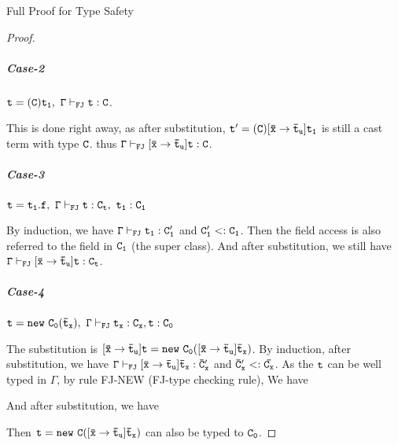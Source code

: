 \begin{section}{Full Proof for Type Safety}
\begin{proof}
\subparagraph{Case-2}$\tt t=(C) t_1,\ \Gamma\vdash_{FJ} t:C$.
\par This is done right away, as after substitution, $\tt t'=(C)[\bar{x}\rightarrow \bar{t}_u]t_1$ is still a cast term with type $\tt C$. thus $\tt\Gamma \vdash_{FJ} [\bar{x}\rightarrow\bar{t}_u]t:C$.

\subparagraph{Case-3}$\tt t=t_1.f,\ \Gamma\vdash_{FJ} t:C_t,\ t_1:C_1$
\par
By induction, we have $\tt \Gamma\vdash_{FJ} t_1:C'_1$ and $\tt C'_1 <: C_1$. 
Then the field access is also referred to the field in $\tt C_1$ (the super class). And after substitution, we still have $\tt \Gamma\vdash_{FJ} [\bar{x}\rightarrow\bar{t}_u]t:C_t$.

\subparagraph{Case-4} $\tt t=new\ C_0(\bar{t}_x),\ \Gamma\vdash_{FJ} t_x:C_x, t:C_0$
\par
The substitution is $\tt[\bar{x}\rightarrow\bar{t}_u]t = new\ C_0([\bar{x}\rightarrow\bar{t}_u]\bar{t}_x)$.
By induction, after substitution, we have $\tt \Gamma\vdash_{FJ} [\bar{x}\rightarrow\bar{t}_u]\bar{t}_x:\bar{C}'_x$ and $\tt \bar{C}'_x<:\bar{C_x}$. 
As the $\tt t$ can be well typed in $\Gamma$, by rule FJ-NEW (FJ-type checking rule), 
We have 
\begin{center}
\DP
\end{center}
And after substitution, we have 
\begin{center}
\DP
\end{center}
Then $\tt t=new\ C([\bar{x}\rightarrow\bar{t}_u]\bar{t}_x)$ can also be typed to $\tt C_0$.


\end{proof}
\end{section}
